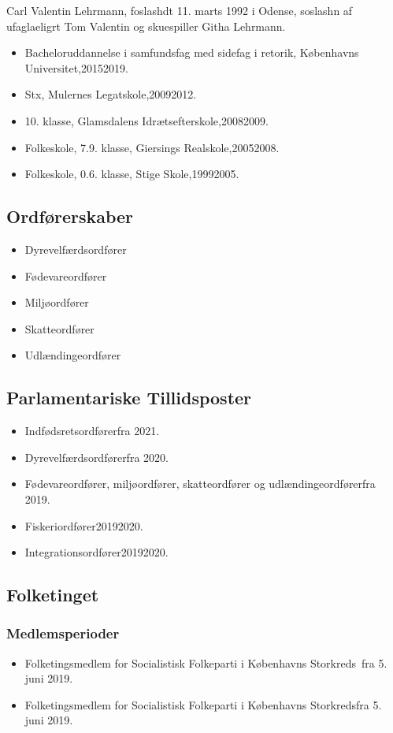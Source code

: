 \documentclass[11pt, a4paper]{awesome-cv}
\begin{document}
\makecvheader[R]
\makelettertitle
\begin{cvletter}
Carl Valentin Lehrmann, foslashdt 11. marts 1992 i Odense, soslashn af ufaglaeligrt Tom Valentin og skuespiller Githa Lehrmann.

\begin{itemize}
\item Bacheloruddannelse i samfundsfag med sidefag i retorik, Københavns Universitet,20152019.
\item Stx, Mulernes Legatskole,20092012.
\item 10. klasse, Glamsdalens Idrætsefterskole,20082009.
\item Folkeskole, 7.9. klasse, Giersings Realskole,20052008.
\item Folkeskole, 0.6. klasse, Stige Skole,19992005.
\end{itemize}
\subsection*{Ordførerskaber}
\begin{itemize}
\item Dyrevelfærdsordfører
\item Fødevareordfører
\item Miljøordfører
\item Skatteordfører
\item Udlændingeordfører
\end{itemize}
\subsection*{Parlamentariske Tillidsposter}
\begin{itemize}
\item Indfødsretsordførerfra 2021.
\item Dyrevelfærdsordførerfra 2020.
\item Fødevareordfører, miljøordfører, skatteordfører og udlændingeordførerfra 2019.
\item Fiskeriordfører20192020.
\item Integrationsordfører20192020.
\end{itemize}
\subsection*{Folketinget}
\subsubsection*{Medlemsperioder}
\begin{itemize}
\item Folketingsmedlem for Socialistisk Folkeparti i Københavns Storkreds fra 5. juni 2019.
\item Folketingsmedlem for Socialistisk Folkeparti i Københavns Storkredsfra 5. juni 2019.
\end{itemize}

\end{cvletter}
\end{document}
